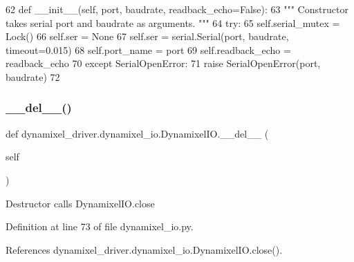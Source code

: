 \begin{DoxyCode}
62     \textcolor{keyword}{def }\_\_init\_\_(self, port, baudrate, readback\_echo=False):
63         \textcolor{stringliteral}{""" Constructor takes serial port and baudrate as arguments. """}
64         \textcolor{keywordflow}{try}:
65             self.serial\_mutex = Lock()
66             self.ser = \textcolor{keywordtype}{None}
67             self.ser = serial.Serial(port, baudrate, timeout=0.015)
68             self.port\_name = port
69             self.readback\_echo = readback\_echo
70         \textcolor{keywordflow}{except} SerialOpenError:
71            \textcolor{keywordflow}{raise} SerialOpenError(port, baudrate)
72 
\end{DoxyCode}
\mbox{\label{classdynamixel__driver_1_1dynamixel__io_1_1_dynamixel_i_o_a2a13aea3e96f34e02926c4395924359e}} 
\subsubsection{\texorpdfstring{\+\_\+\+\_\+del\+\_\+\+\_\+()}{\_\_del\_\_()}}
{\footnotesize\ttfamily def dynamixel\+\_\+driver.\+dynamixel\+\_\+io.\+Dynamixel\+I\+O.\+\_\+\+\_\+del\+\_\+\+\_\+ (\begin{DoxyParamCaption}\item[{}]{self }\end{DoxyParamCaption})}

\begin{DoxyVerb}Destructor calls DynamixelIO.close \end{DoxyVerb}
 

Definition at line 73 of file dynamixel\+\_\+io.\+py.



References dynamixel\+\_\+driver.\+dynamixel\+\_\+io.\+Dynamixel\+I\+O.\+close().


